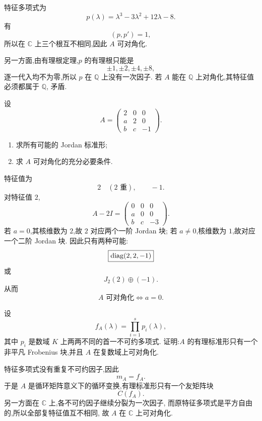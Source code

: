 \begin{solution}
特征多项式为
\[
p(\lambda)
=
\lambda^3-3\lambda^2+12\lambda-8.
\]
有
\[
(p,p')=1,
\]
所以在 $\mathbb{C}$ 上三个根互不相同,因此 $A$ 可对角化.

另一方面,由有理根定理,$p$ 的有理根只能是
\[
\pm1,\pm2,\pm4,\pm8,
\]
逐一代入均不为零,所以 $p$ 在 $\mathbb{Q}$ 上没有一次因子.
若 $A$ 能在 $\mathbb{Q}$ 上对角化,其特征值必须都属于 $\mathbb{Q}$,
矛盾.
\end{solution}


\begin{example}
设
\[
A=
\begin{pmatrix}
2&0&0\\
a&2&0\\
b&c&-1
\end{pmatrix}.
\]
\begin{enumerate}
    \item 求所有可能的 Jordan 标准形;
    \item 求 $A$ 可对角化的充分必要条件.
\end{enumerate}
\end{example}
\exampleblank

\begin{solution}
特征值为
\[
2\quad(2\text{ 重}),\qquad -1.
\]
对特征值 $2$,
\[
A-2I=
\begin{pmatrix}
0&0&0\\
a&0&0\\
b&c&-3
\end{pmatrix}.
\]
若 $a=0$,其核维数为 $2$,故 $2$ 对应两个一阶 Jordan 块;
若 $a\neq0$,核维数为 $1$,故对应一个二阶 Jordan 块.
因此只有两种可能:
\[
\boxed{
\operatorname{diag}(2,2,-1)
}
\]
或
\[
\boxed{
J_2(2)\oplus(-1).
}
\]
从而
\[
\boxed{
A\text{ 可对角化}\iff a=0.
}
\]
\end{solution}


\begin{example}
设
\[
f_A(\lambda)
=
\prod\limits_{i=1}^{s}p_i(\lambda),
\]
其中 $p_i$ 是数域 $K$ 上两两不同的首一不可约多项式.
证明:$A$ 的有理标准形只有一个非平凡 Frobenius 块,并且
$A$ 在复数域上可对角化.
\end{example}
\exampleblank

\begin{solution}
特征多项式没有重复不可约因子,因此
\[
m_A=f_A.
\]
于是 $A$ 是循环矩阵意义下的循环变换,有理标准形只有一个友矩阵块
\[
C(f_A).
\]
另一方面在 $\mathbb{C}$ 上,各不可约因子继续分裂为一次因子,
而原特征多项式是平方自由的,所以全部复特征值互不相同,
故 $A$ 在 $\mathbb{C}$ 上可对角化.
\end{solution}


